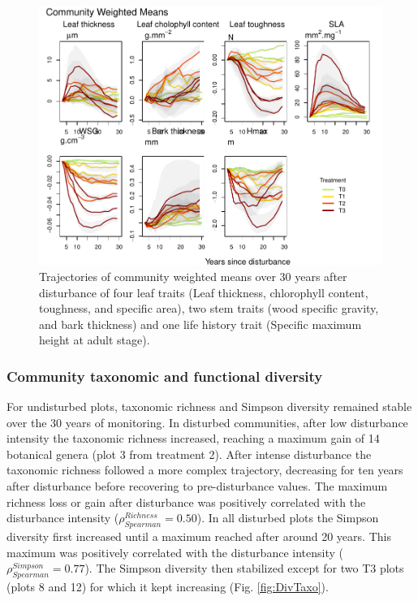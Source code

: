 \documentclass[
  11pt,
  french,
  A4paper,
  extrafontsizes,onecolumn,openright
  ]{memoir}
\begin{document}
\begin{figure}

{\centering \includegraphics[width=1\linewidth]{Manuscript_files/figure-latex/CWM-1} 

}

\caption{Trajectories of community weighted means over 30 years after disturbance of four leaf traits (Leaf thickness, chlorophyll content, toughness, and specific area), two stem traits (wood specific gravity, and bark thickness) and one life history trait (Specific maximum height at adult stage). }\label{fig:CWM}
\end{figure}

\subsubsection{Community taxonomic and functional
diversity}\label{community-taxonomic-and-functional-diversity}

For undisturbed plots, taxonomic richness and Simpson diversity remained
stable over the 30 years of monitoring. In disturbed communities, after
low disturbance intensity the taxonomic richness increased, reaching a
maximum gain of 14 botanical genera (plot 3 from treatment 2). After
intense disturbance the taxonomic richness followed a more complex
trajectory, decreasing for ten years after disturbance before recovering
to pre-disturbance values. The maximum richness loss or gain after
disturbance was positively correlated with the disturbance intensity
(\(\rho_{Spearman}^{Richness}=0.50\)). In all disturbed plots the
Simpson diversity first increased until a maximum reached after around
20 years. This maximum was positively correlated with the disturbance
intensity (\(\rho_{Spearman}^{Simpson}=0.77\)). The Simpson diversity
then stabilized except for two T3 plots (plots 8 and 12) for which it
kept increasing (Fig. \ref{fig:DivTaxo}).
\end{document}
